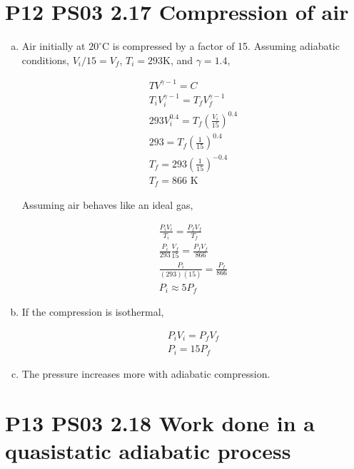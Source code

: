 \documentclass[9pt,a4paper,twocolumn]{article}
\begin{document}
\section{P12 PS03 2.17 Compression of air}
\begin{enumerate}[(a)]

\item Air initially at $20^\circ$C is compressed by a factor of 15. Assuming adiabatic conditions, $V_i/15 = V_f$, $T_i = 293$K, and $\gamma = 1.4$,

\begin{eqnarray}
	TV^{\gamma -1} = C \label{eq:adiabatic} \\
	T_i V_i^{\gamma-1} = T_f V_f^{\gamma - 1} \nonumber \\
	293 V_i^{0.4} = T_f \left( \frac{V_i}{15} \right)^{0.4} \nonumber \\
	293 = T_f \left(\frac{1}{15}\right)^{0.4} \nonumber \\
	T_f = 293 \left( \frac{1}{15} \right)^{-0.4} \nonumber \\
	\boxed{T_f = 866\textrm{ K}} \label{eq:answer1}
\end{eqnarray}

Assuming air behaves like an ideal gas,

\begin{eqnarray}
	\frac{P_i V_i}{T_i} = \frac{P_f V_f}{T_f} \\
	\frac{P_i}{293}\frac{V_f}{15} = \frac{P_f V_f}{866} \nonumber \\
	\frac{P_i}{(293)(15)} = \frac{P_f}{866} \nonumber \\
	\boxed{P_i \approx 5 P_f} \label{eq:answer2}
\end{eqnarray}

	\item If the compression is isothermal,

\begin{eqnarray}
	P_i V_i = P_f V_f \\
	\boxed{P_i = 15 P_f} \label{eq:answer3}
\end{eqnarray}

	\item The pressure increases more with adiabatic compression.

\end{enumerate}

\section{P13 PS03 2.18 Work done in a quasistatic adiabatic process}
\end{document}
